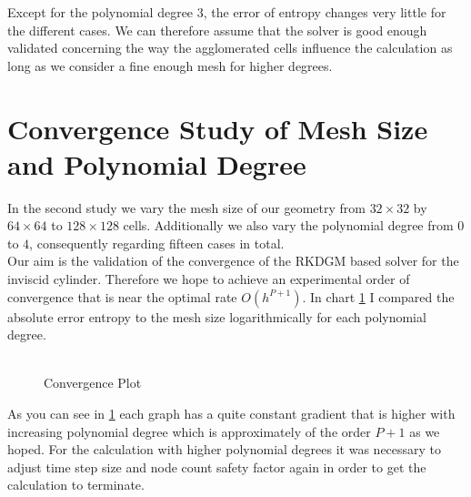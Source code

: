 	Except for the polynomial degree $3$, the error of entropy changes very little for the different cases. We can therefore assume that the solver is good enough validated concerning the way the agglomerated cells influence the calculation as long as we consider a fine enough mesh for higher degrees.
	
	\section{Convergence Study of Mesh Size and Polynomial Degree}
	
	In the second study we vary the mesh size of our geometry from $32 \times 32$ by $64 \times 64$ to $128 \times 128$ cells. Additionally we also vary the polynomial degree from $0$ to $4$, consequently regarding fifteen cases in total. \\
	Our aim is the validation of the convergence of the RKDGM based solver for the inviscid cylinder. Therefore we hope to achieve an experimental order of convergence that is near the optimal rate $O(h^{P+1})$. In chart \ref{mesherror} I compared the absolute error entropy to the mesh size logarithmically for each polynomial degree. 	\\\\
	\begin{figure}[htp]
		\centering		
		\caption{Convergence Plot}
		\label{mesherror}
	\end{figure}
	As you can see in \ref{mesherror} each graph has a quite constant gradient that is higher with increasing polynomial degree which is approximately of the order $P+1$ as we hoped. For the calculation with higher polynomial degrees it was necessary to adjust time step size and node count safety factor again in order to get the calculation to terminate. \\ \indent
